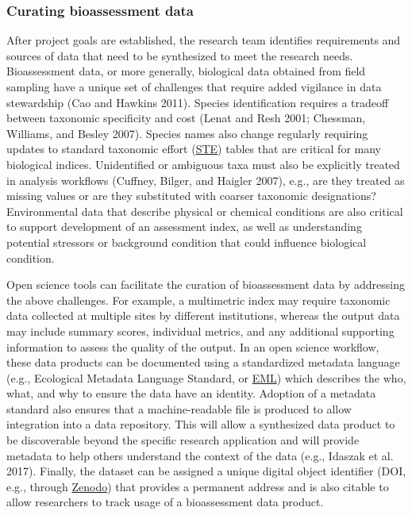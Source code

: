 \documentclass[fleqn,10pt,lineno]{wlpeerj} %
\begin{document}
\hypertarget{curating-bioassessment-data}{%
\subsubsection{Curating bioassessment data}\label{curating-bioassessment-data}}

After project goals are established, the research team identifies requirements and sources of data that need to be synthesized to meet the research needs. Bioassessment data, or more generally, biological data obtained from field sampling have a unique set of challenges that require added vigilance in data stewardship (Cao and Hawkins 2011). Species identification requires a tradeoff between taxonomic specificity and cost (Lenat and Resh 2001; Chessman, Williams, and Besley 2007). Species names also change regularly requiring updates to standard taxonomic effort (\href{http://www.safit.org/Docs/STE_1_March_2011_7MB.pdf}{STE}) tables that are critical for many biological indices. Unidentified or ambiguous taxa must also be explicitly treated in analysis workflows (Cuffney, Bilger, and Haigler 2007), e.g., are they treated as missing values or are they substituted with coarser taxonomic designations? Environmental data that describe physical or chemical conditions are also critical to support development of an assessment index, as well as understanding potential stressors or background condition that could influence biological condition.

Open science tools can facilitate the curation of bioassessment data by addressing the above challenges. For example, a multimetric index may require taxonomic data collected at multiple sites by different institutions, whereas the output data may include summary scores, individual metrics, and any additional supporting information to assess the quality of the output. In an open science workflow, these data products can be documented using a standardized metadata language (e.g., Ecological Metadata Language Standard, or \href{https://knb.ecoinformatics.org/external//emlparser/docs/index.html}{EML}) which describes the who, what, and why to ensure the data have an identity. Adoption of a metadata standard also ensures that a machine-readable file is produced to allow integration into a data repository. This will allow a synthesized data product to be discoverable beyond the specific research application and will provide metadata to help others understand the context of the data (e.g., Idaszak et al. 2017). Finally, the dataset can be assigned a unique digital object identifier (DOI, e.g., through \href{https://zenodo.org/}{Zenodo}) that provides a permanent address and is also citable to allow researchers to track usage of a bioassessment data product.
\end{document}
